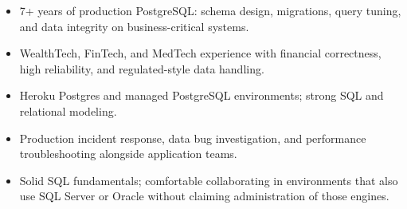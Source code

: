 
\begin{cvparagraph}
\begin{itemize}[leftmargin=2ex, nosep, noitemsep]
  \setlength{\parskip}{0pt}
  \renewcommand{\labelitemi}{\bullet}
  \item {7+ years of production PostgreSQL: schema design, migrations, query tuning, and data integrity on business-critical systems.}
  \item {WealthTech, FinTech, and MedTech experience with financial correctness, high reliability, and regulated-style data handling.}
  \item {Heroku Postgres and managed PostgreSQL environments; strong SQL and relational modeling.}
  \item {Production incident response, data bug investigation, and performance troubleshooting alongside application teams.}
  \item {Solid SQL fundamentals; comfortable collaborating in environments that also use SQL Server or Oracle without claiming administration of those engines.}
\end{itemize}
\end{cvparagraph}
